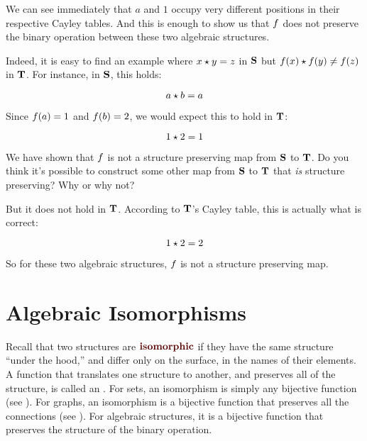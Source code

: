 \documentclass[../../../main.tex]{subfiles}
\begin{document}
\begin{example}
We can see immediately that $a$ and $1$ occupy very different positions in their respective Cayley tables. And this is enough to show us that $f$ does not preserve the binary operation between these two algebraic structures.

Indeed, it is easy to find an example where $\op{x}{y} = z$ in $\mathbf{S}$ but $\op{\func{f}(x)}{\func{f}(y)} \not = \func{f}(z)$ in $\mathbf{T}$. For instance, in $\mathbf{S}$, this holds:

\begin{equation*}
  \op{a}{b} = a
\end{equation*}

Since $f(a) = 1$ and $f(b) = 2$, we would expect this to hold in $\mathbf{T}$:

\begin{equation*}
  \op{1}{2} = {1}
\end{equation*}

\begin{ponder}
  We have shown that $f$ is not a structure preserving map from $\mathbf{S}$ to $\mathbf{T}$. Do you think it's possible to construct some other map from $\mathbf{S}$ to $\mathbf{T}$ that \emph{is} structure preserving? Why or why not?
\end{ponder}

But it does not hold in $\mathbf{T}$. According to $\mathbf{T}$'s Cayley table, this is actually what is correct:

\begin{equation*}
  \op{1}{2} = 2
\end{equation*}

So for these two algebraic structures, $f$ is not a structure preserving map.

\end{example}


\section{Algebraic Isomorphisms}

\begin{terminology}
  Recall that two structures are $\vocab{isomorphic}$ if they have the same structure ``under the hood,'' and differ only on the surface, in the names of their elements. A function that translates one structure to another, and preserves all of the structure, is called an . For sets, an isomorphism is simply any bijective function (see ). For graphs, an isomorphism is a bijective function that preserves all the connections (see ). For algebraic structures, it is a bijective function that preserves the structure of the binary operation.
\end{terminology}
\end{document}
